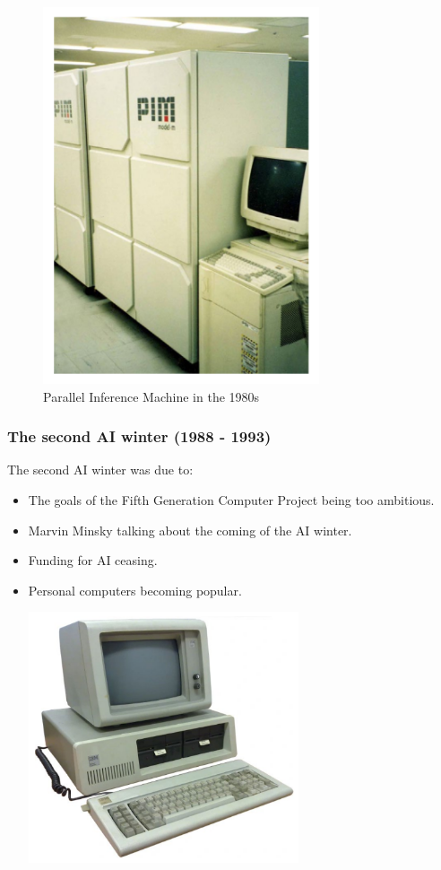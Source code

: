 \documentclass[11pt]{article}
\begin{document}
\begin{figure}[htbp]
\centering
\includegraphics[height=30em]{./images/parallel-inference-machine.png}
\caption{Parallel Inference Machine in the 1980s}
\end{figure}

 \newpage
\subsubsection{The second AI winter (1988 - 1993)}
\label{sec:org6ba3830}
The second AI winter was due to:
\begin{itemize}
\item The goals of the Fifth Generation Computer Project being too ambitious.
\item Marvin Minsky talking about the coming of the AI winter.
\item Funding for AI ceasing.
\item Personal computers becoming popular.
\begin{center}
\includegraphics[height=20em]{./images/pc-in-the-1980s.png}
\end{center}
\end{itemize}
\end{document}
